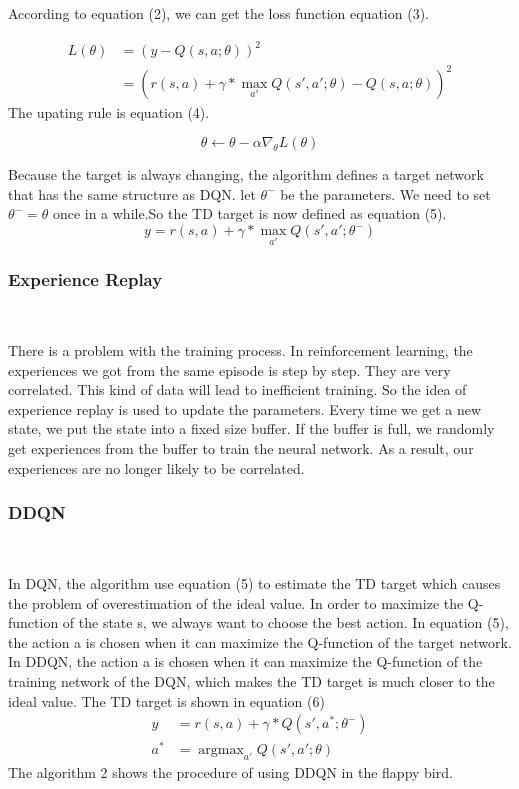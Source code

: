 \documentclass[conference,compsoc]{IEEEtran}
\begin{document}
According to equation (2), we can get the loss function equation (3).

\begin{equation}
\begin{align}
L(\theta)&=(y-Q(s,a;\theta))^2\\
&=(r(s,a) + \gamma * \mathop{max}_{a'}Q(s',a';\theta)-Q(s,a;\theta))^2
\end{align}
\end{equation}
The upating rule is equation (4).

\begin{equation}
\theta  \leftarrow \theta - \alpha\nabla_{\theta}{L(\theta)}
\end{equation}

Because the target is always changing, the algorithm defines a target network that has the same structure as DQN. let ${\theta^-}$ be the parameters. We need to set ${\theta^- = \theta}$ once in a while.So the TD target is now defined as equation (5).
\begin{equation}
y=r(s,a) + \gamma * \mathop{max}_{a'}Q(s',a';\theta^-)
\end{equation}

\subsubsection{Experience Replay}
 
 \

\indent There is a problem with the training process. In reinforcement learning, the experiences we got from the same episode is step by step. They are very correlated. This kind of data will lead to inefficient training. So the idea of experience replay is used to update the parameters. Every time we get a new state, we put the state into a fixed size buffer. If the buffer is full, we randomly get experiences from the buffer to train the neural network. As a result, our experiences are no longer likely to be correlated.

\subsubsection{DDQN}
  
 \

\indent In DQN, the algorithm use equation (5) to estimate the TD target which causes the problem of overestimation of the ideal value. In order to maximize the Q-function of the state s, we always want to choose the best action. In equation (5), the action a is chosen when it can maximize the Q-function of the target network. In DDQN,  the action a is chosen when it can maximize the Q-function of the training network of the DQN, which makes the TD target is much closer to the ideal value. The TD target is shown in equation (6)
\begin{equation}
\begin{align}
y &=r(s,a) + \gamma * Q(s',a^*;\theta^-)
\\
a^*&=\mathop{\arg\max}_{a'} Q(s',a';\theta)
\end{align}
\end{equation}
The algorithm 2 shows the procedure of using DDQN in the flappy bird.
\end{document}
